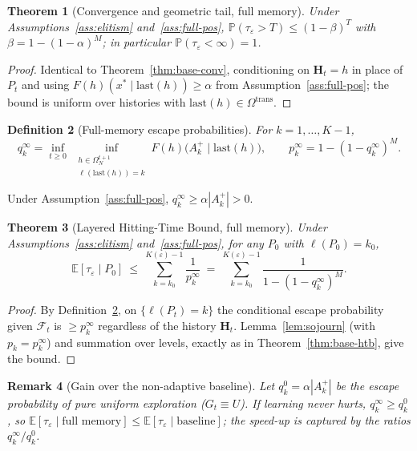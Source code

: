 \documentclass[11pt,a4paper]{article}
\newtheorem{theorem}{Theorem}[section]
\newtheorem{definition}[theorem]{Definition}
\newtheorem{remark}[theorem]{Remark}
\newcommand{\Omn}{\Omega_N}
\newcommand{\Omt}{\Omega^{\mathrm{trans}}}
\newcommand{\calF}{\mathcal{F}}
\newcommand{\E}{\mathbb{E}}
\newcommand{\Prob}{\mathbb{P}}
\newcommand{\Akp}{A_k^{+}}
\begin{document}
\begin{theorem}[Convergence and geometric tail, full memory]
\label{thm:full-conv}
  Under Assumptions~\ref{ass:elitism} and~\ref{ass:full-pos},
  $\Prob(\tau_\varepsilon>T)\le(1-\beta)^T$ with
  $\beta=1-(1-\alpha)^M$; in particular $\Prob(\tau_\varepsilon<\infty)=1$.
\end{theorem}

\begin{proof}
  Identical to Theorem~\ref{thm:base-conv}, conditioning on
  $\mathbf{H}_t=h$ in place of $P_t$ and using
  $F(h)(x^*\mid\mathrm{last}(h))\ge\alpha$ from
  Assumption~\ref{ass:full-pos}; the bound is uniform over histories with
  $\mathrm{last}(h)\in\Omt$.
\end{proof}

\begin{definition}[Full-memory escape probabilities]\label{def:full-qk}
  For $k=1,\dots,K-1$,
  \[
    q_k^\infty=\inf_{t\ge0}\
      \inf_{\substack{h\in\Omn^{t+1}\\\ell(\mathrm{last}(h))=k}}
      F(h)\!\bigl(\Akp\mid\mathrm{last}(h)\bigr),
    \qquad p_k^\infty=1-(1-q_k^\infty)^M.
  \]
\end{definition}

Under Assumption~\ref{ass:full-pos}, $q_k^\infty\ge\alpha|\Akp|>0$.

\begin{theorem}[Layered Hitting-Time Bound, full memory]
\label{thm:full-htb}
  Under Assumptions~\ref{ass:elitism} and~\ref{ass:full-pos}, for any
  $P_0$ with $\ell(P_0)=k_0$,
  \[
    \E[\tau_\varepsilon\mid P_0]
    \ \le\ \sum_{k=k_0}^{K(\varepsilon)-1}\frac1{p_k^\infty}
    \ =\ \sum_{k=k_0}^{K(\varepsilon)-1}\frac1{1-(1-q_k^\infty)^M}.
  \]
\end{theorem}

\begin{proof}
  By Definition~\ref{def:full-qk}, on $\{\ell(P_t)=k\}$ the conditional
  escape probability given $\calF_t$ is $\ge p_k^\infty$ regardless of
  the history $\mathbf{H}_t$.  Lemma~\ref{lem:sojourn} (with
  $p_k=p_k^\infty$) and summation over levels, exactly as in
  Theorem~\ref{thm:base-htb}, give the bound.
\end{proof}

\begin{remark}[Gain over the non-adaptive baseline]
  Let $q_k^0=\alpha|\Akp|$ be the escape probability of pure uniform
  exploration ($G_t\equiv U$).  If learning never hurts, $q_k^\infty\ge
  q_k^0$, so $\E[\tau_\varepsilon\mid\text{full memory}]\le
  \E[\tau_\varepsilon\mid\text{baseline}]$; the speed-up is captured by
  the ratios $q_k^\infty/q_k^0$.
\end{remark}
\end{document}
